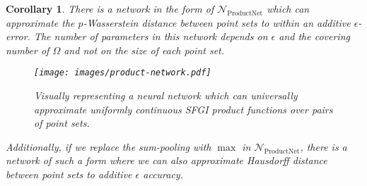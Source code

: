 \documentclass[12pt]{article}
\newcommand{\Network}{\mathcal{N}_{\mathrm{ProductNet}}}
\newtheorem{corollary}[theorem]{Corollary}
\newcommand{\SFGI} {{SFGI}}
\begin{document}
\begin{corollary}\label{cor:goodNN}
There is a network in the form of $\Network$ which can approximate the $p$-Wasserstein distance between point sets to within an additive $\epsilon$-error. The number of parameters in this network depends on $\epsilon$ and the covering number of $\Omega$ and not on the size of each point set.

\begin{figure}
    \centering
    \texttt{[image: images/product-network.pdf]}
    \caption{{\small Visually representing a neural network which can universally approximate uniformly continuous \SFGI{} product functions over pairs of point sets.} }
    \label{fig:product-network}
\end{figure}
 
Additionally, if we replace the sum-pooling with $\max$ in $\Network$, there is a network of such a form where we can also approximate Hausdorff distance between point sets to additive $\epsilon$ accuracy.
\end{corollary}
\end{document}
